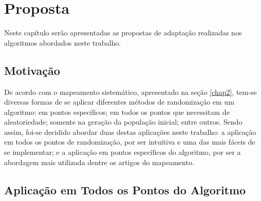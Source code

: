\chapter{Proposta}
\label{sec:proposta}

Neste capítulo serão apresentadas as propostas de adaptação realizadas nos algoritmos abordados neste trabalho.

\section{Motivação}

De acordo com o mapeamento sistemático, apresentado na seção \ref{chap2}, tem-se diversas formas de se aplicar diferentes métodos de randomização em um algoritmo: em pontos específicos; em todos os pontos que necessitam de aleatoriedade; somente na geração da população inicial; entre outros. Sendo assim, foi-se decidido abordar duas destas aplicações neste trabalho: a aplicação em todos os pontos de randomização, por ser intuitiva e uma das mais fáceis de se implementar; e a aplicação em pontos específicos do algoritmo, por ser a abordagem mais utilizada dentre os artigos do mapeamento.




\section{Aplicação em Todos os Pontos do Algoritmo}

